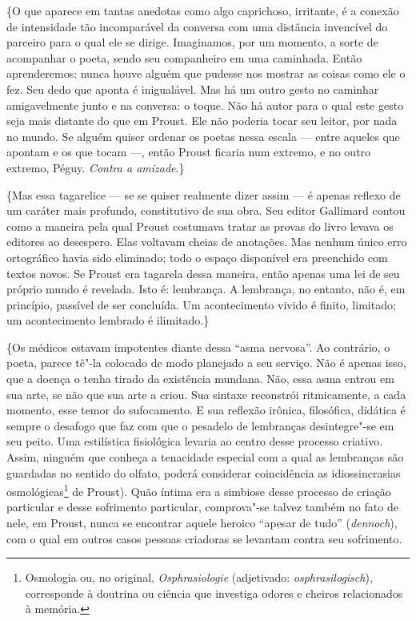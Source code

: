 \{O que aparece em tantas anedotas como algo caprichoso, irritante, é a
conexão de intensidade tão incomparável da conversa com uma distância
invencível do parceiro para o qual ele se dirige. Imaginamos, por um
momento, a sorte de acompanhar o poeta, sendo seu companheiro em uma
caminhada. Então aprenderemos: nunca houve alguém que pudesse nos
mostrar as coisas como ele o fez. Seu dedo que aponta é inigualável. Mas
há um outro gesto no caminhar amigavelmente junto e na conversa: o
toque. Não há autor para o qual este gesto seja mais distante do que em
Proust. Ele não poderia tocar seu leitor, por nada no mundo. Se alguém
quiser ordenar os poetas nessa escala --- entre aqueles que apontam e os
que tocam ---, então Proust ficaria num extremo, e no outro extremo,
Péguy. \emph{Contra a amizade}.\}

\{Mas essa tagarelice --- se se quiser realmente dizer assim --- é apenas
reflexo de um caráter mais profundo, constitutivo de sua obra. Seu
editor Gallimard contou como a maneira pela qual Proust costumava tratar
as provas do livro levava os editores ao desespero. Elas voltavam
cheias de anotações. Mas nenhum único erro ortográfico havia sido
eliminado; todo o espaço disponível era preenchido com textos novos. Se
Proust era tagarela dessa maneira, então apenas uma lei de seu próprio
mundo é revelada. Isto é: lembrança. A lembrança, no entanto, não é, em
princípio, passível de ser concluída. Um acontecimento vivido é finito,
limitado; um acontecimento lembrado é ilimitado.\}

\{Os médicos estavam impotentes diante dessa ``asma nervosa''. Ao
contrário, o poeta, parece tê"-la colocado de modo planejado a seu
serviço. Não é apenas isso, que a doença o tenha tirado da existência
mundana. Não, essa asma entrou em sua arte, se não que sua arte a criou.
Sua sintaxe reconstrói ritmicamente, a cada momento, esse temor do
sufocamento. E sua reflexão irônica, filosófica, didática é sempre o
desafogo que faz com que o pesadelo de lembranças desintegre"-se em seu
peito. Uma estilística fisiológica levaria ao centro desse processo
criativo. Assim, ninguém que conheça a tenacidade especial com a qual as
lembranças são guardadas no sentido do olfato, poderá considerar
coincidência as idiossincrasias osmológicas\footnote{Osmologia ou,
  no original, \emph{Osphrasiologie} (adjetivado:
  \emph{osphrasilogisch}), corresponde à doutrina ou ciência que
  investiga odores e cheiros relacionados à memória. \versal{[N. E.]}} de Proust). Quão
íntima era a simbiose desse processo de criação particular e desse
sofrimento particular, comprova"-se talvez também no fato de nele, em
Proust, nunca se encontrar aquele heroico ``apesar de tudo''
(\emph{dennoch}), com o qual em outros casos pessoas criadoras se
levantam contra seu sofrimento.


